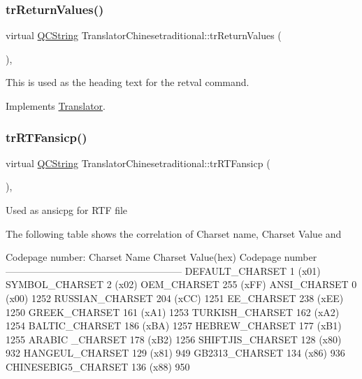 \mbox{\label{class_translator_chinesetraditional_a71d32839c4b744f25b05f0e4bdac450c}} 
\subsubsection{\texorpdfstring{trReturnValues()}{trReturnValues()}}
{\footnotesize\ttfamily virtual \mbox{\hyperlink{class_q_c_string}{Q\+C\+String}} Translator\+Chinesetraditional\+::tr\+Return\+Values (\begin{DoxyParamCaption}{ }\end{DoxyParamCaption})\hspace{0.3cm}{\ttfamily [inline]}, {\ttfamily [virtual]}}

This is used as the heading text for the retval command. 

Implements \mbox{\hyperlink{class_translator}{Translator}}.

\mbox{\label{class_translator_chinesetraditional_a823b4850251a1459b460f2a68f98f034}} 
\subsubsection{\texorpdfstring{trRTFansicp()}{trRTFansicp()}}
{\footnotesize\ttfamily virtual \mbox{\hyperlink{class_q_c_string}{Q\+C\+String}} Translator\+Chinesetraditional\+::tr\+R\+T\+Fansicp (\begin{DoxyParamCaption}{ }\end{DoxyParamCaption})\hspace{0.3cm}{\ttfamily [inline]}, {\ttfamily [virtual]}}

Used as ansicpg for R\+TF file

The following table shows the correlation of Charset name, Charset Value and 
\begin{DoxyPre}
Codepage number:
Charset Name       Charset Value(hex)  Codepage number
------------------------------------------------------
DEFAULT\_CHARSET           1 (x01)
SYMBOL\_CHARSET            2 (x02)
OEM\_CHARSET             255 (xFF)
ANSI\_CHARSET              0 (x00)            1252
RUSSIAN\_CHARSET         204 (xCC)            1251
EE\_CHARSET              238 (xEE)            1250
GREEK\_CHARSET           161 (xA1)            1253
TURKISH\_CHARSET         162 (xA2)            1254
BALTIC\_CHARSET          186 (xBA)            1257
HEBREW\_CHARSET          177 (xB1)            1255
ARABIC \_CHARSET         178 (xB2)            1256
SHIFTJIS\_CHARSET        128 (x80)             932
HANGEUL\_CHARSET         129 (x81)             949
GB2313\_CHARSET          134 (x86)             936
CHINESEBIG5\_CHARSET     136 (x88)             950
\end{DoxyPre}
 

